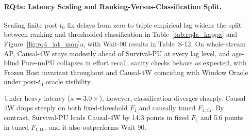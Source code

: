 \documentclass[pdflatex,sn-basic]{sn-jnl}
\theoremstyle{definition}
\theoremstyle{plain}
\begin{document}
\paragraph{RQ4a: Latency Scaling and Ranking-Versus-Classification Split.}
Scaling finite post-$t_0$ fix delays from zero to triple empirical lag widens the split between ranking and thresholded classification in Table~\ref{tab:rq4a_kappa} and Figure~\ref{fig:rq4_lat_mon}a, with Wait-90 results in Table~S-12. On whole-stream AP, Causal-4W stays modestly ahead of Survival-PU at every lag level, and age-blind Pure-nnPU collapses in effort recall; sanity checks behave as expected, with Frozen Host invariant throughout and Causal-4W coinciding with Window Oracle under post-$t_0$ oracle visibility.

Under heavy latency ($\kappa = 3.0\times$), however, classification diverges sharply. Causal-4W drops steeply on both fixed-threshold $F_1$ and causally tuned $F_{1,\text{th}}$. By contrast, Survival-PU leads Causal-4W by 14.3 points in fixed $F_1$ and 5.6 points in tuned $F_{1,\text{th}}$, and it also outperforms Wait-90.
\end{document}
